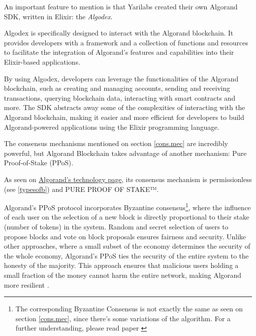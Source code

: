 \begin{tcolorbox}[colback=white!20!white,colframe=red!80!black,rounded corners]
\danger An important feature to mention is that Yarilabs created their own Algorand SDK\footnotemark, written in Elixir: the \textit{Algodex}.\newline

Algodex is specifically designed to interact with the Algorand blockchain. It provides developers with a framework and a collection of functions and resources to facilitate the integration of Algorand's features and capabilities into their Elixir-based applications.\newline

By using Algodex, developers can leverage the functionalities of the Algorand blockchain, such as creating and managing accounts, sending and receiving transactions, querying blockchain data, interacting with smart contracts and more. The SDK abstracts away some of the complexities of interacting with the Algorand blockchain, making it easier and more efficient for developers to build Algorand-powered applications using the Elixir programming language.\danger
\end{tcolorbox}


The consensus mechanisms mentioned on section \ref{cons.mec} are incredibly powerful, but Algorand Blockchain takes advantage of another mechanism: Pure Proof-of-Stake (PPoS).

As seen on \href{https://algorand.com/technology/algorand-protocol}{Algorand's technology page}, its consensus mechanism is permissionless (see \ref{typesofb}) and PURE PROOF OF STAKE™.\newline

Algorand's PPoS protocol incorporates Byzantine consensus\footnote{The corresponding Byzantine Consensus is not exactly the same as seen on section \ref{cons.mec}, since there's some variations of the algorithm. For a further understanding, please read paper \cite{algo}}, where the influence of each user on the selection of a new block is directly proportional to their stake (number of tokens) in the system. Random and secret selection of users to propose blocks and vote on block proposals ensures fairness and security. Unlike other approaches, where a small subset of the economy determines the security of the whole economy, Algorand's PPoS ties the security of the entire system to the honesty of the majority. This approach ensures that malicious users holding a small fraction of the money cannot harm the entire network, making Algorand more resilient \cite{alg}.\newline

